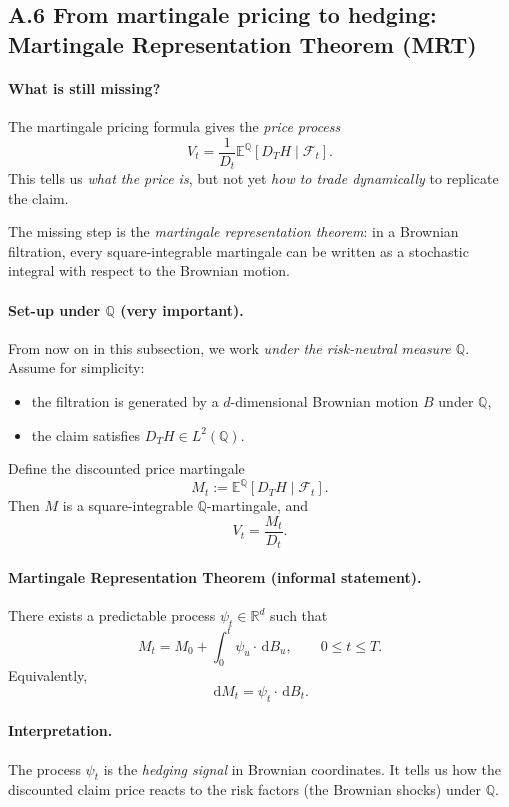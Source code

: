 \documentclass[11pt]{article}
\newcommand{\Qbb}{\mathbb{Q}}
\newcommand{\E}{\mathbb{E}}
\newcommand{\R}{\mathbb{R}}
\newcommand{\dd}{\,\mathrm{d}}
\newcommand{\1}{\mathbf{1}}
\begin{document}
\subsection*{A.6 From martingale pricing to hedging: Martingale Representation Theorem (MRT)}

\paragraph{What is still missing?}
The martingale pricing formula gives the \emph{price process}
$$
V_t=\frac{1}{D_t}\E^{\Qbb}[D_T H\mid \mathcal F_t].
$$
This tells us \emph{what the price is}, but not yet \emph{how to trade dynamically} to replicate the claim.

The missing step is the \emph{martingale representation theorem}: in a Brownian filtration, every square-integrable martingale can be written as a stochastic integral with respect to the Brownian motion.

\paragraph{Set-up under \(\Qbb\) (very important).}
From now on in this subsection, we work \emph{under the risk-neutral measure \(\Qbb\)}.
Assume for simplicity:
\begin{itemize}[leftmargin=1.4em]
    \item the filtration is generated by a \(d\)-dimensional Brownian motion \(B\) under \(\Qbb\),
    \item the claim satisfies \(D_T H\in L^2(\Qbb)\).
\end{itemize}

Define the discounted price martingale
$$
M_t:=\E^{\Qbb}[D_T H\mid \mathcal F_t].
$$
Then \(M\) is a square-integrable \(\Qbb\)-martingale, and
$$
V_t=\frac{M_t}{D_t}.
$$

\paragraph{Martingale Representation Theorem (informal statement).}
There exists a predictable process \(\psi_t\in\R^d\) such that
$$
\boxed{\ M_t=M_0+\int_0^t \psi_u\cdot \dd B_u,\qquad 0\le t\le T. \ }
$$
Equivalently,
$$
\dd M_t=\psi_t\cdot \dd B_t.
$$

\paragraph{Interpretation.}
The process \(\psi_t\) is the \emph{hedging signal} in Brownian coordinates.
It tells us how the discounted claim price reacts to the risk factors (the Brownian shocks) under \(\Qbb\).
\end{document}
